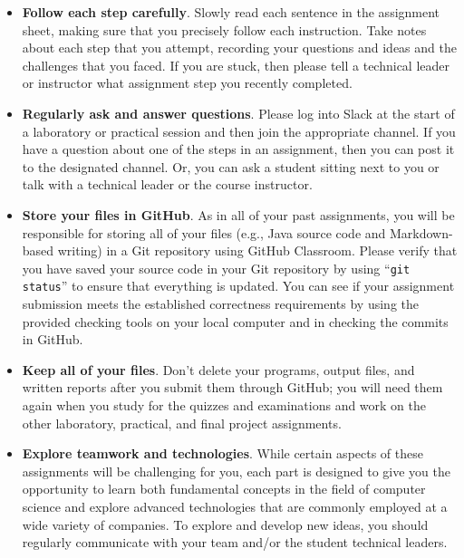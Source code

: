\documentclass[11pt]{article}
\newcommand{\command}[1]{``\lstinline{#1}''}
\begin{document}
\begin{itemize}
  \setlength{\itemsep}{0pt}

\item {\bf Follow each step carefully}. Slowly read each sentence in the
  assignment sheet, making sure that you precisely follow each instruction.
  Take notes about each step that you attempt, recording your questions and
  ideas and the challenges that you faced. If you are stuck, then please tell a
  technical leader or instructor what assignment step you recently completed.

\item {\bf Regularly ask and answer questions}. Please log into Slack at the
  start of a laboratory or practical session and then join the appropriate
  channel. If you have a question about one of the steps in an assignment, then
  you can post it to the designated channel. Or, you can ask a student sitting
  next to you or talk with a technical leader or the course instructor.

\item {\bf Store your files in GitHub}. As in all of your past assignments, you
  will be responsible for storing all of your files (e.g., Java source code and
  Markdown-based writing) in a Git repository using GitHub Classroom. Please
  verify that you have saved your source code in your Git repository by using
  \command{git status} to ensure that everything is updated. You can see if
  your assignment submission meets the established correctness requirements by
  using the provided checking tools on your local computer and in checking the
  commits in GitHub.

\item {\bf Keep all of your files}. Don't delete your programs, output files,
  and written reports after you submit them through GitHub; you will need them
  again when you study for the quizzes and examinations and work on the other
  laboratory, practical, and final project assignments.

\item {\bf Explore teamwork and technologies}. While certain aspects of these
  assignments will be challenging for you, each part is designed to give you the
  opportunity to learn both fundamental concepts in the field of computer
  science and explore advanced technologies that are commonly employed at a wide
  variety of companies. To explore and develop new ideas, you should regularly
  communicate with your team and/or the student technical leaders.


\end{itemize}
\end{document}
